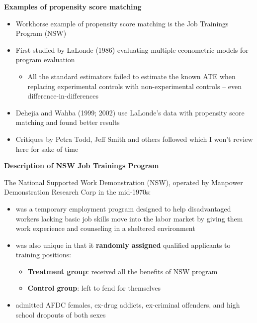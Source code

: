 \documentclass[notes=show]{beamer}
\begin{document}
\begin{frame}[plain]
	\begin{center}
	\textbf{Examples of propensity score matching}
	\end{center}
	
	\begin{itemize}
	\item Workhorse example of propensity score matching is the Job Trainings Program (NSW) 
	\item First studied by LaLonde (1986) evaluating multiple econometric models for program evaluation 
		\begin{itemize}
		\item All the standard estimators failed to estimate the known ATE when replacing experimental controls with non-experimental controls -- even difference-in-differences
		\end{itemize}
	\item Dehejia and Wahba (1999; 2002) use LaLonde's data with propensity score matching and found better results
	\item Critiques by Petra Todd, Jeff Smith and others followed which I won't review here for sake of time
	\end{itemize}
\end{frame}



\begin{frame}[plain]
	\begin{center}
	\textbf{Description of NSW Job Trainings Program}
	\end{center}
	
The National Supported Work Demonstration (NSW), operated by Manpower Demonstration Research Corp in the mid-1970s:
	\begin{itemize}
	\item was a temporary employment program designed to help disadvantaged workers lacking basic job skills move into the labor market by giving them work experience and counseling in a sheltered environment
	\item was also unique in that it \textbf{randomly assigned} qualified applicants to training positions:
		\begin{itemize}
		\item \textbf{Treatment group}: received all the benefits of NSW program
		\item \textbf{Control group}: left to fend for themselves
		\end{itemize}
	\item admitted AFDC females, ex-drug addicts, ex-criminal offenders, and high school dropouts of both sexes
	\end{itemize}
\end{frame}
\end{document}
